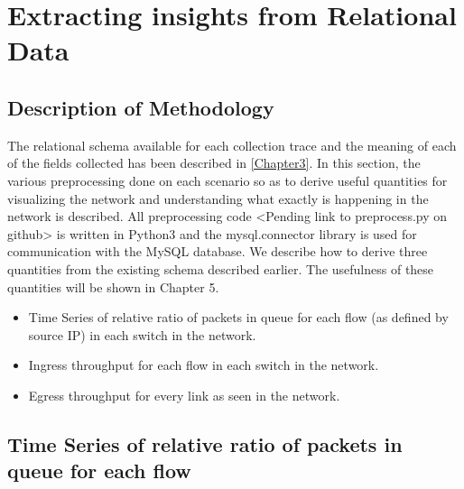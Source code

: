 
\chapter{Extracting insights from Relational Data} %

\label{Chapter4} %



\section{Description of Methodology}

The relational schema available for each collection trace and the meaning of each of the fields collected has been described in \ref{Chapter3}.
In this section, the various preprocessing done on each scenario so as to derive useful quantities for visualizing the network and understanding
what exactly is happening in the network is described. All preprocessing code <Pending link to preprocess.py on github> is written in Python3
and the mysql.connector library is used for communication with the MySQL database.
\newline
We describe how to derive three quantities from the existing schema described earlier. The usefulness of these quantities will be shown in Chapter 5.

\begin{itemize}
    \item Time Series of relative ratio of packets in queue for each flow (as defined by source IP) in each switch in the network.
    \item Ingress throughput for each flow in each switch in the network.
    \item Egress throughput for every link as seen in the network.
\end{itemize}

\section{Time Series of relative ratio of packets in queue for each flow}

